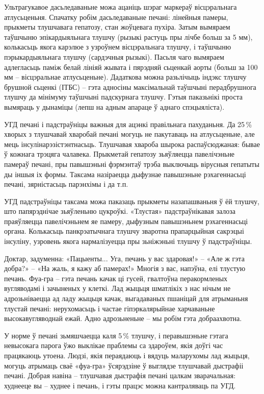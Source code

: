 Ультрагукавое дасьледаваньне можа ацаніць шэраг маркераў вісцэральнага атлусьценьня. Спачатку робім дасьледаваньне печані: лінейныя памеры, прыкметы тлушчавага гепатозу, стан жоўцевага пухіра. Затым вымяраем таўшчыню эпікардыяльнага тлушчу (рызыкі растуць пры лічбе больш за 5 мм), колькасьць якога карэлюе з узроўнем вісцэральнага тлушчу, і таўшчыню пэрыкардыяльнага тлушчу (сардэчныя рызыкі). Пасьля чаго вымяраем адлегласьць паміж белай лініяй жывата і пярэдняй сьценкай аорты (больш за 100 мм – вісцэральнае атлусьценьне). Дадаткова можна разьлічыць індэкс тлушчу брушной сьценкі (ІТБС) – гэта адносіны максімальнай таўшчыні перадбрушнога тлушчу да мінімуму таўшчыні падскурнага тлушчу. Гэтыя паказьнікі проста вымяраць у дынаміцы (лепш на адным апараце ў аднаго спэцыяліста).

УГД печані і падстраўніцы важныя для ацэнкі правільнага пахуданьня. Да 25\,\% хворых з тлушчавай хваробай печані могуць не пакутаваць на атлусьценьне, але мець інсулінарэзістэнтнасьць. Тлушчавая хвароба шырока распаўсюджаная: бывае ў кожнага трэцяга чалавека. Прыкметай гепатозу зьяўляецца павелічэньне памераў печані, пры павышэньні фэрмэнтаў трэба выключыць вірусныя гепатыты ды іншыя іх формы. Таксама назіраецца дыфузнае павышэньне рэхагеннасьці печані, зярністасьць парэнхімы і да т.п.

УГД падстраўніцы таксама можа паказаць прыкметы назапашваньня ў ёй тлушчу, што папярэднічае зьяўленьню цукроўкі. «Тлустая» падстраўнікавая залоза праяўляецца павелічэньнем яе памеру, дыфузным павышэньнем рэхагеннасьці органа. Колькасьць панкрэатычнага тлушчу зваротна прапарцыйная сакрэцыі інсуліну, узровень якога нармалізуецца пры зьніжэньні тлушчу ў падстраўніцы.

Доктар, задуменна: «Пацыенты... Уга, печань у вас здаровая!» – «Але ж гэта добра?» – «На жаль, я кажу аб памерах!» Многія з вас, напэўна, елі тлустую печань. Фуа-гра – гэта печань качак ці гусей, гвалтоўна перакормленых вугляводамі і зачыненых у клеткі. Лад жыцьця шматлікіх з нас нічым не адрозьніваецца ад ладу жыцьця качак, выгадаваных пшаніцай для атрыманьня тлустай печані: нерухомасьць і частае гіпэркалярыйнае харчаваньне высокавугляводнай ежай. Адно адрозьненьне – мы робім гэта добраахвотна.

У норме ў печані зьмяшчаецца каля 5\,\% тлушчу, і перавышэньне гэтага невысокага парога ўжо выклікае праблемы са здароўем, якія доўгі час працякаюць утоена. Людзі, якія пераядаюць і вядуць маларухомы лад жыцьця, могуць атрымаць сваё «фуа-гра» ўсярэдзіне ў выглядзе тлушчавай дыстрафіі печані. Добрая навіна – тлушчавая дыстрафія печані цалкам зварачальная: худнееце вы – худнее і печань, і гэты працэс можна кантраляваць па УГД.

